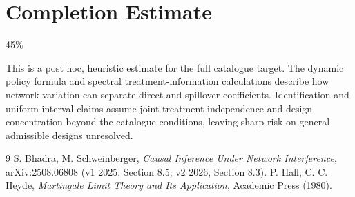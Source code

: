 \documentclass[11pt]{article}
\theoremstyle{definition}
\begin{document}
\section{Completion Estimate}
45\%

This is a post hoc, heuristic estimate for the full catalogue target.
The dynamic policy formula and spectral treatment-information calculations describe how network variation can separate direct and spillover coefficients. Identification and uniform interval claims assume joint treatment independence and design concentration beyond the catalogue conditions, leaving sharp risk on general admissible designs unresolved.

\begin{thebibliography}{9}
 S. Bhadra, M. Schweinberger, \emph{Causal Inference Under Network Interference}, arXiv:2508.06808 (v1 2025, Section 8.5; v2 2026, Section 8.3).
 P. Hall, C. C. Heyde, \emph{Martingale Limit Theory and Its Application}, Academic Press (1980).
\end{thebibliography}
\end{document}
